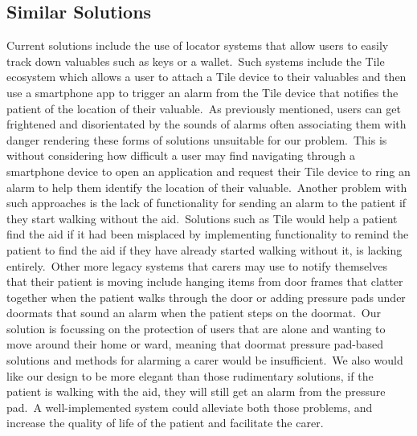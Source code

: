         \subsection{Similar Solutions}
            Current solutions include the use of locator systems that allow users to easily track down valuables such as
            keys or a wallet.\ Such systems include the Tile ecosystem which allows a user to attach a Tile device to
            their valuables and then use a smartphone app to trigger an alarm from the Tile device that notifies the
            patient of the location of their valuable.\ As previously mentioned, users can get frightened and
            disorientated by the sounds of alarms often associating them with danger rendering these forms of solutions
            unsuitable for our problem.\ This is without considering how difficult a user may find navigating through
            a smartphone device to open an application and request their Tile device to ring an alarm to help them
            identify the location of their valuable.\ Another problem with such approaches is the lack of functionality
            for sending an alarm to the patient if they start walking without the aid.\ Solutions such as Tile would
            help a patient find the aid if it had been misplaced by implementing functionality to remind the patient
            to find the aid if they have already started walking without it, is lacking entirely.\ Other more legacy
            systems that carers may use to notify themselves that their patient is moving include hanging items from
            door frames that clatter together when the patient walks through the door or adding pressure pads under doormats that sound an alarm when the patient steps on the doormat.\ Our solution is focussing on the protection
            of users that are alone and wanting to move around their home or ward, meaning that doormat pressure pad-based solutions and methods for alarming a carer would be insufficient.\ We also would like our design to be
            more elegant than those rudimentary solutions, if the patient is walking with the aid, they will still get
            an alarm from the pressure pad.\ A well-implemented system could alleviate both those problems, and increase
            the quality of life of the patient and facilitate the carer.

